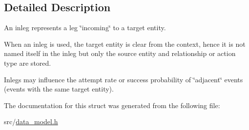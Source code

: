 \subsection{Detailed Description}
An inleg represents a leg \char`\"{}incoming\char`\"{} to a target entity. 

When an inleg is used, the target entity is clear from the context, hence it is not named itself in the inleg but only the source entity and relationship or action type are stored.

Inlegs may influence the attempt rate or success probability of \char`\"{}adjacent\char`\"{} events (events with the same target entity). 

The documentation for this struct was generated from the following file\+:\begin{DoxyCompactItemize}
\item 
src/\hyperlink{data__model_8h}{data\+\_\+model.\+h}\end{DoxyCompactItemize}
